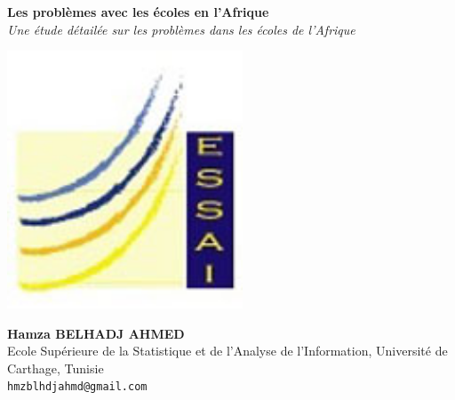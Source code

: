 \documentclass[a0, portrait]{a0poster}
\begin{document}


\begin{minipage}[b]{0.75\linewidth}
\VeryHuge \color{NavyBlue} \textbf{Les problèmes avec les écoles en l'Afrique} \color{Black}\\[0.5cm]%
\Huge\textit{Une étude détailée sur les problèmes dans les écoles de l'Afrique}\\[0.5cm]%
\end{minipage}
%
\begin{minipage}[b]{0.25\linewidth}
\includegraphics[width=7cm]{logo-essai.jpg}
\end{minipage}

\begin{minipage}[b]{0.75\linewidth}
\huge \textbf{Hamza BELHADJ AHMED}\\[0.5cm] %
\Large Ecole Sup\'erieure de la Statistique et de l'Analyse de l'Information, Université de Carthage, Tunisie\\[0.4cm] %
\large \texttt{hmzblhdjahmd@gmail.com}\\
\end{minipage}


\vspace{1cm} %
\end{document}
